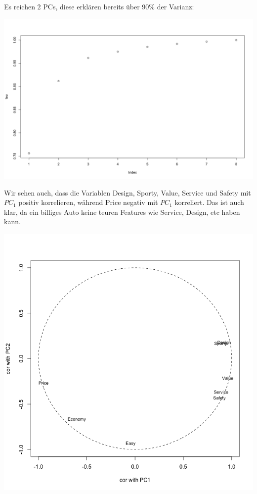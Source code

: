 \documentclass{article}
\begin{document}
	Es reichen 2 PCs, diese erklären bereits über 90\% der Varianz:
	\begin{center}
		\includegraphics[scale=0.18]{2_1_var}
	\end{center}
	Wir sehen auch, dass die Variablen Design, Sporty, Value, Service und Safety mit $PC_1$ positiv korrelieren, während Price negativ mit $PC_1$ korreliert. Das ist auch klar, da ein billiges Auto keine teuren Features wie Service, Design, etc haben kann.
	\begin{center}
		\includegraphics[scale=0.3]{2_1_cor}
	\end{center}
\end{document}
